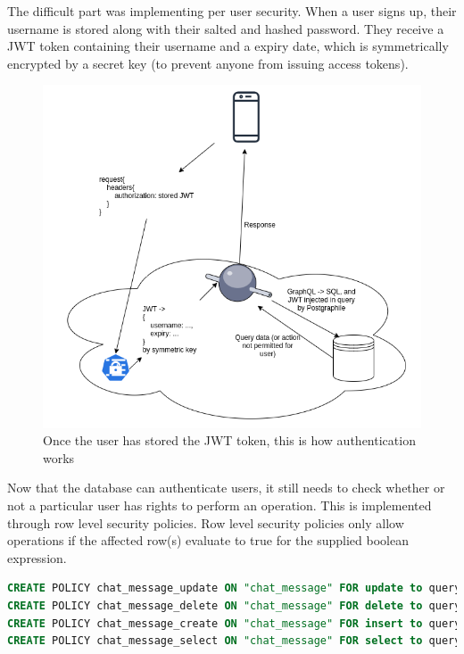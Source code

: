 \documentclass{l4proj}
\begin{document}
The difficult part was implementing per user security. When a user signs up, their username is stored along with their salted and hashed password. They receive a JWT token containing their username and a expiry date, which is symmetrically encrypted by a secret key (to prevent anyone from issuing access tokens). 
\begin{figure}[bp!]
    \centering
    \includegraphics[width=1.0\linewidth]{authentication.png}    

    \caption{
  Once the user has stored the JWT token, this is how authentication works
    }
\end{figure}

Now that the database can authenticate users, it still needs to check whether or not a particular user has rights to perform an operation. This is implemented through row level security policies. Row level security policies only allow operations if the affected row(s) evaluate to true for the supplied boolean expression.


\begin{lstlisting}[language=SQL, caption={Row level security policies for accessing chat messages}, ]
CREATE POLICY chat_message_update ON "chat_message" FOR update to query_sender USING (username = (select username from active_user()));
CREATE POLICY chat_message_delete ON "chat_message" FOR delete to query_sender USING (username = (select username from active_user()));
CREATE POLICY chat_message_create ON "chat_message" FOR insert to query_sender with check (username = (select username from active_user()) and groupName = (select groupName from active_user()));
CREATE POLICY chat_message_select ON "chat_message" FOR select to query_sender using (groupName = (select groupName from active_user()));
\end{lstlisting}
\end{document}
